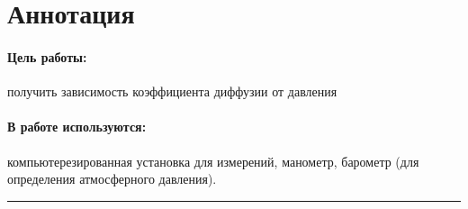 \documentclass[a4paper,12pt]{report}
\begin{document}
	
	\newpage
    \pagestyle{fancy}

    \fancyhead{}
    \fancyfoot{}
    \fancyhead[L]{\rightmark}
    \fancyhead[R]{\thepage}

    \section*{Аннотация}
        \paragraph*{Цель работы:} получить зависимость коэффициента диффузии от давления
        \paragraph*{В работе используются:} компьютерезированная установка для измерений, манометр, барометр (для определения атмосферного давления). 
    \vspace{0.5cm}
    \hrule
\end{document}
